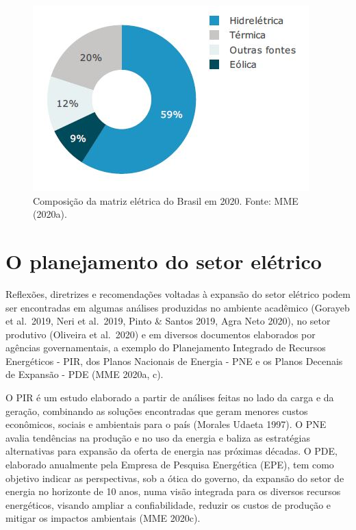 \documentclass[
  oneside]{scrbook}
\begin{document}
\begin{figure}[H]

{\centering \includegraphics[width=0.6\linewidth]{imagens/cap01/Figura_1.1} 

}

\caption{Composição da matriz elétrica do Brasil em 2020. Fonte: MME (2020a).}\label{fig:01}
\end{figure}

\hypertarget{o-planejamento-do-setor-eluxe9trico}{%
\section{O planejamento do setor elétrico}\label{o-planejamento-do-setor-eluxe9trico}}

Reflexões, diretrizes e recomendações voltadas à expansão do setor elétrico podem ser encontradas em algumas análises produzidas no ambiente acadêmico (Gorayeb et al.~2019, Neri et al.~2019, Pinto \& Santos 2019, Agra Neto 2020), no setor produtivo (Oliveira et al.~2020) e em diversos documentos elaborados por agências governamentais, a exemplo do Planejamento Integrado de Recursos Energéticos - PIR, dos Planos Nacionais de Energia - PNE e os Planos Decenais de Expansão - PDE (MME 2020a, c).

O PIR é um estudo elaborado a partir de análises feitas no lado da carga e da geração, combinando as soluções encontradas que geram menores custos econômicos, sociais e ambientais para o país (Morales Udaeta 1997). O PNE avalia tendências na produção e no uso da energia e baliza as estratégias alternativas para expansão da oferta de energia nas próximas décadas. O PDE, elaborado anualmente pela Empresa de Pesquisa Energética (EPE), tem como objetivo indicar as perspectivas, sob a ótica do governo, da expansão do setor de energia no horizonte de 10 anos, numa visão integrada para os diversos recursos energéticos, visando ampliar a confiabilidade, reduzir os custos de produção e mitigar os impactos ambientais (MME 2020c).
\end{document}
